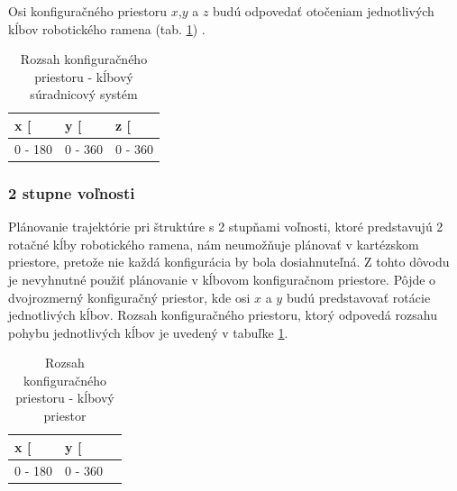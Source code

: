 Osi konfiguračného priestoru $x$,$y$ a $z$ budú odpovedať otočeniam jednotlivých kĺbov robotického ramena (tab. \ref{table 3.2}) .
\begin{table}[h]
	\centering
	\begin{tabular}{|c|c|c|}
		\hline
		\multicolumn{1}{|l|}{x {[}\degree{]}}  & \multicolumn{1}{l|}{y {[}\degree{]}} & \multicolumn{1}{l|}{z {[}\degree{]}} \\ \hline
		0 - 180                                             & 0 - 360                                             & 0 - 360                              \\ \hline
		
	\end{tabular}
	\caption{Rozsah konfiguračného priestoru - kĺbový súradnicový systém}\label{table 3.2} 
\end{table}



\subsubsection{2 stupne voľnosti}


Plánovanie trajektórie pri štruktúre s 2 stupňami voľnosti, ktoré predstavujú 2 rotačné kĺby robotického ramena, nám neumožňuje plánovať v kartézskom priestore, pretože nie každá konfigurácia by bola dosiahnuteľná. Z tohto dôvodu je nevyhnutné použiť plánovanie v kĺbovom konfiguračnom priestore. Pôjde o dvojrozmerný konfiguračný priestor, kde osi $x$ a $y$ budú predstavovať rotácie jednotlivých kĺbov. Rozsah konfiguračného priestoru, ktorý odpovedá rozsahu pohybu jednotlivých kĺbov je uvedený v tabuľke \ref{table 3.2}.

\begin{table}[h]
	\centering
	\begin{tabular}{|c|c|c|}
		\hline
		\multicolumn{1}{|l|}{x {[}\degree{]}}  & \multicolumn{1}{l|}{y {[}\degree{]}} \\ \hline
		0 - 180                                             & 0 - 360       \\ \hline
		
	\end{tabular}
	\caption{Rozsah konfiguračného priestoru - kĺbový priestor}\label{table 3.3} 
\end{table}




